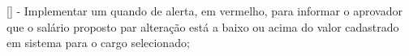 [] - Implementar um quando de alerta, em vermelho, para informar o aprovador que o salário proposto par alteração está a baixo ou  acima do valor cadastrado em sistema para o cargo selecionado;